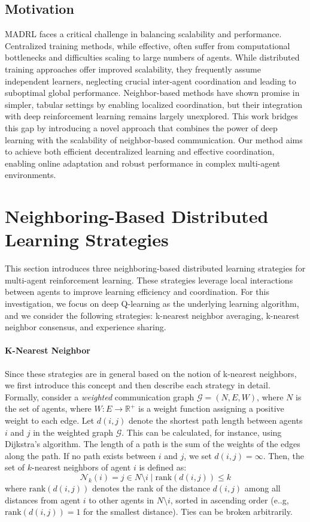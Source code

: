 \documentclass[sigconf]{acmart}
\begin{document}
\subsection{Motivation}
MADRL faces a critical challenge in balancing scalability and performance.  
Centralized training methods, while effective, often suffer from computational bottlenecks and difficulties scaling to large numbers of agents. 
While distributed training approaches offer improved scalability, 
they frequently assume independent learners, 
neglecting crucial inter-agent coordination and leading to suboptimal global performance.  
%
Neighbor-based methods have shown promise in simpler, 
tabular settings by enabling localized coordination,
but their integration with deep reinforcement learning remains largely unexplored. 
This work bridges this gap by introducing a novel approach that combines the power of deep learning with the scalability of neighbor-based communication.  
Our method aims to achieve both efficient decentralized learning and effective coordination, 
enabling online adaptation and robust performance in complex multi-agent environments.
\section{Neighboring-Based Distributed Learning Strategies}\label{sec:neighboring}
This section introduces three neighboring-based distributed learning strategies for multi-agent reinforcement learning.
These strategies leverage local interactions between agents to improve learning efficiency and coordination.
For this investigation, we focus on deep Q-learning as the underlying learning algorithm,
and we consider the following strategies: k-nearest neighbor averaging, k-nearest neighbor consensus, and experience sharing.

\paragraph{K-Nearest Neighbor}
Since these strategies are in general based on the notion of k-nearest neighbors,
we first introduce this concept and then describe each strategy in detail.
Formally, consider a \emph{weighted} communication graph $\mathcal{G} = (N, E, W)$, where $N$ is the set of agents, where $W: E \rightarrow \mathbb{R}^+$ is a weight function assigning a positive weight to each edge.  
Let $d(i,j)$ denote the shortest path length between agents $i$ and $j$ in the weighted graph $\mathcal{G}$. 
This can be calculated, for instance, using Dijkstra's algorithm. 
The length of a path is the sum of the weights of the edges along the path. 
If no path exists between $i$ and $j$, we set $d(i,j) = \infty$.
%
Then, the set of $k$-nearest neighbors of agent $i$ is defined as:
$$ \mathcal{N}_k(i) = { j \in N \setminus {i} \mid \text{rank}(d(i,j)) \leq k } $$
where $\text{rank}(d(i,j))$ denotes the rank of the distance $d(i,j)$ among all distances from agent $i$ to other agents in $N \setminus {i}$, sorted in ascending order (e..g, $\text{rank}(d(i,j)) = 1$ for the smallest distance).
Ties can be broken arbitrarily.
\end{document}
